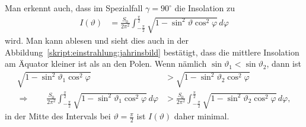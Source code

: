 Man erkennt auch, dass im Spezialfall $\gamma=90^\circ$ die Insolation zu
\begin{align*}
I(\vartheta)
&=
\frac{S_0}{2\pi^2}
\int_{-\frac{\pi}2}^{\frac{\pi}2}
\sqrt{1- \sin^2\vartheta\cos^2\varphi}
\,d\varphi
\end{align*}
wird.
Man kann ablesen und sieht dies auch in der 
Abbildung~\ref{skript:einstrahlung:jahrinsbild} bestätigt, dass
die mittlere Insolation am Äquator kleiner ist als an den Polen.
Wenn nämlich $\sin\vartheta_1 < \sin\vartheta_2$, dann ist
\begin{align*}
\sqrt{1- \sin^2\vartheta_1\cos^2\varphi}
&>
\sqrt{1- \sin^2\vartheta_2\cos^2\varphi}
\\
\Rightarrow
\qquad
\frac{S_0}{2\pi^2}
\int_{-\frac{\pi}2}^{\frac{\pi}2}
\sqrt{1- \sin^2\vartheta_1\cos^2\varphi}
\,d\varphi
&>
\frac{S_0}{2\pi^2}
\int_{-\frac{\pi}2}^{\frac{\pi}2}
\sqrt{1- \sin^2\vartheta_2\cos^2\varphi}
\,d\varphi,
\end{align*}
in der Mitte des Intervals bei $\vartheta=\frac{\pi}2$ ist $I(\vartheta)$
daher minimal.

